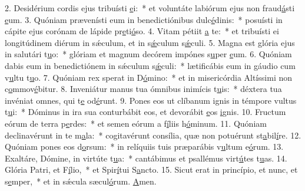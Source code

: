 2. Desidérium cordis ejus tribuísti \uline{e}i:~* et voluntáte labiórum ejus non fraud\uline{á}sti \uline{e}um.
3. Quóniam prævenísti eum in benedictiónibus dulc\uline{é}dinis:~* posuísti in cápite ejus corónam de lápide pr\uline{e}ti\uline{ó}so.
4. Vitam pétiit \uline{a} te:~* et tribuísti ei longitúdinem diérum in sǽculum, et in s\uline{ǽ}culum s\uline{ǽ}culi.
5. Magna est glória ejus in salutári t\uline{u}o:~* glóriam et magnum decórem impónes s\uline{u}per \uline{e}um.
6. Quóniam dabis eum in benedictiónem in sǽculum s\uline{ǽ}culi:~* lætificábis eum in gáudio cum v\uline{u}ltu t\uline{u}o.
7. Quóniam rex sperat in D\uline{ó}mino:~* et in misericórdia Altíssimi non c\uline{o}mmov\uline{é}bitur.
8. Inveniátur manus tua ómnibus inimícis t\uline{u}is:~* déxtera tua invéniat omnes, qui t\uline{e} od\uline{é}runt.
9. Pones eos ut clíbanum ignis in témpore vultus t\uline{u}i:~* Dóminus in ira sua conturbábit eos, et devorábit \uline{e}os \uline{i}gnis.
10. Fructum eórum de terra p\uline{e}rdes:~* et semen eórum a f\uline{í}liis h\uline{ó}minum.
11. Quóniam declinavérunt in te m\uline{a}la:~* cogitavérunt consília, quæ non potuérunt st\uline{a}bil\uline{í}re.
12. Quóniam pones eos d\uline{o}rsum:~* in relíquiis tuis præparábis v\uline{u}ltum e\uline{ó}rum.
13. Exaltáre, Dómine, in virtúte t\uline{u}a:~* cantábimus et psallémus virt\uline{ú}tes t\uline{u}as.
14. Glória Patri, et F\uline{í}lio,~* et Spir\uline{í}tui S\uline{a}ncto.
15. Sicut erat in princípio, et nunc, et s\uline{e}mper,~* et in sǽcula sæcul\uline{ó}rum. \uline{A}men.
